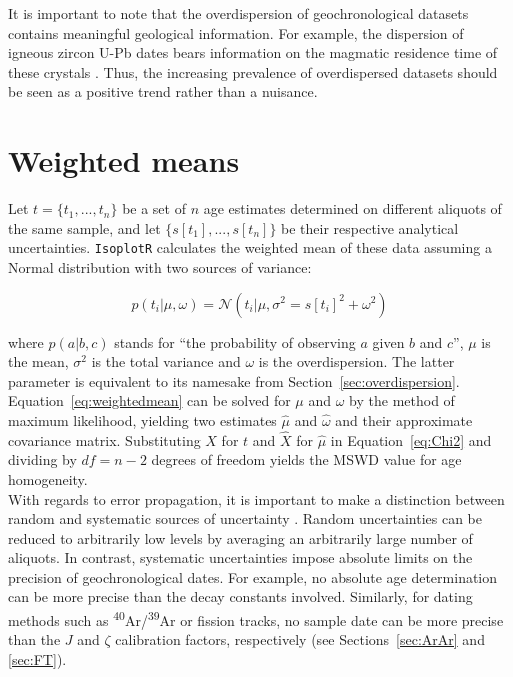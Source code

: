 \documentclass{article}
\begin{document}
It is important to note that the overdispersion of geochronological
datasets contains meaningful geological information. For example, the
dispersion of igneous zircon U-Pb dates bears information on the
magmatic residence time of these crystals \citep{matzel2006,
  rioux2012}.  Thus, the increasing prevalence of overdispersed
datasets should be seen as a positive trend rather than a nuisance.

\section{Weighted means}
\label{sec:averaging}

Let $t = \{t_1, ..., t_n\}$ be a set of $n$ age estimates determined
on different aliquots of the same sample, and let $\{s[t_1], ...,
s[t_n]\}$ be their respective analytical
uncertainties. \texttt{IsoplotR} calculates the weighted mean of these
data assuming a Normal distribution with two sources of variance:

\begin{equation}
  p(t_i|\mu,\omega) = \mathcal{N}\left(
  t_i | \mu,\sigma^2=s[t_i]^2+\omega^2 \right)
  \label{eq:weightedmean}
\end{equation}

\noindent where $p(a|b,c)$ stands for ``the probability of observing
$a$ given $b$ and $c$'', $\mu$ is the mean, $\sigma^2$ is the total
variance and $\omega$ is the overdispersion. The latter parameter is
equivalent to its namesake from
Section~\ref{sec:overdispersion}. Equation~\ref{eq:weightedmean} can
be solved for $\mu$ and $\omega$ by the method of maximum likelihood,
yielding two estimates $\hat{\mu}$ and $\hat{\omega}$ and their
approximate covariance matrix. Substituting $X$ for $t$ and $\hat{X}$
for $\hat{\mu}$ in Equation~\ref{eq:Chi2} and dividing by $df = n-2$
degrees of freedom yields the MSWD value for age homogeneity.\\

With regards to error propagation, it is important to make a
distinction between random and systematic sources of uncertainty
\citep{horstwood2016}. Random uncertainties can be reduced to
arbitrarily low levels by averaging an arbitrarily large number of
aliquots. In contrast, systematic uncertainties impose absolute limits
on the precision of geochronological dates.  For example, no absolute
age determination can be more precise than the decay constants
involved. Similarly, for dating methods such as
\textsuperscript{40}Ar/\textsuperscript{39}Ar or fission tracks, no
sample date can be more precise than the $J$ and $\zeta$ calibration
factors, respectively (see Sections~\ref{sec:ArAr} and
\ref{sec:FT}).\\
\end{document}
